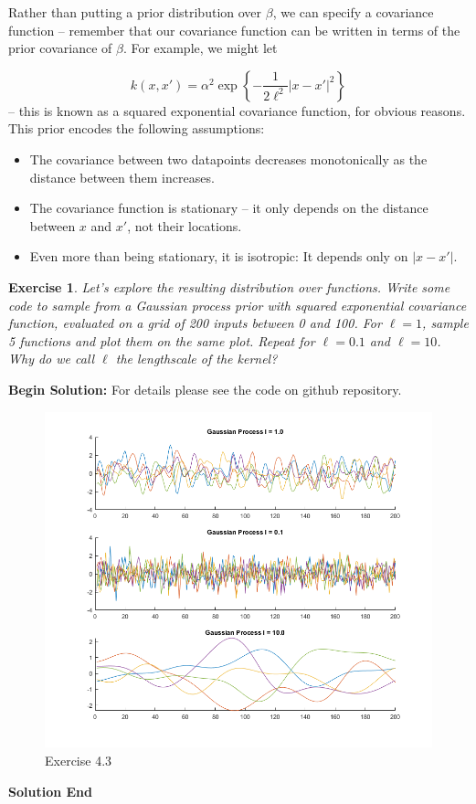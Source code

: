 \documentclass[twoside]{article}
\newcounter{lecnum}
\newtheorem{exercise}{Exercise}[lecnum]
\begin{document}
Rather than putting a prior distribution over $\beta$, we can specify a covariance function -- remember that our covariance function can be written in terms of the prior covariance of $\beta$.  For example, we might let

$$k(x,x') = \alpha^2\exp\left\{-\frac{1}{2\ell^2}|x-x'|^2\right\}$$
 -- this is known as a squared exponential covariance function, for obvious reasons. This prior encodes the following assumptions:
\begin{itemize}
\item The covariance between two datapoints decreases monotonically as the distance between them increases.
\item The covariance function is stationary -- it only depends on the distance between $x$ and $x'$, not their locations.
\item Even more than being stationary, it is isotropic: It depends only on $|x-x'|$.
\end{itemize}

\begin{exercise}
  Let's explore the resulting distribution over functions. Write some code to sample from a Gaussian process prior with squared exponential covariance function, evaluated on a grid of 200 inputs between 0 and 100. For $\ell=1$, sample 5 functions and plot them on the same plot. Repeat for $\ell=0.1$ and $\ell=10$. Why do we call $\ell$ the lengthscale of the kernel?
\end{exercise}

\textbf{Begin Solution:}
For details please see the code on github repository.
\begin{figure}[H]
\begin{center}
\includegraphics[width=\textwidth]{./Exercise43/Figure43.png}
\end{center}
\caption{Exercise 4.3}
\end{figure} 
\textbf{Solution End}
\end{document}

